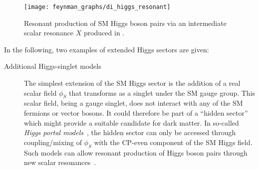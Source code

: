 \begin{figure}[htbp]
  \centering

  \texttt{[image: feynman\_graphs/di\_higgs\_resonant]}

  \caption{Resonant production of SM Higgs boson pairs via an intermediate
    scalar resonance $X$ produced in \ggF.}%
  \label{fig:resonant_production_feyn}
\end{figure}

In the following, two examples of extended Higgs sectors are given:
\begin{description}

\item[Additional Higgs-singlet models] The simplest extension of the SM Higgs
  sector is the addition of a real scalar field $\phi_{S}$ that transforms as a
  singlet under the SM gauge group. This scalar field, being a gauge singlet,
  does not interact with any of the SM fermions or vector bosons. It could
  therefore be part of a ``hidden sector'' which might provide a suitable
  candidate for dark matter. In so-called \emph{Higgs portal
    models}~\cite{Patt:2006fw}, the hidden sector can only be accessed through
  coupling/mixing of $\phi_{S}$ with the CP-even component of the SM Higgs
  field. Such models can allow resonant production of Higgs boson pairs through
  new scalar
  resonances~\cite{Schabinger:2005ei,Bowen:2007ia,Barger:2007im,Dolan:2012ac,No:2013wsa,Chen:2014ask,Robens:2016xkb,DiMicco:2019ngk}.


\end{description}
